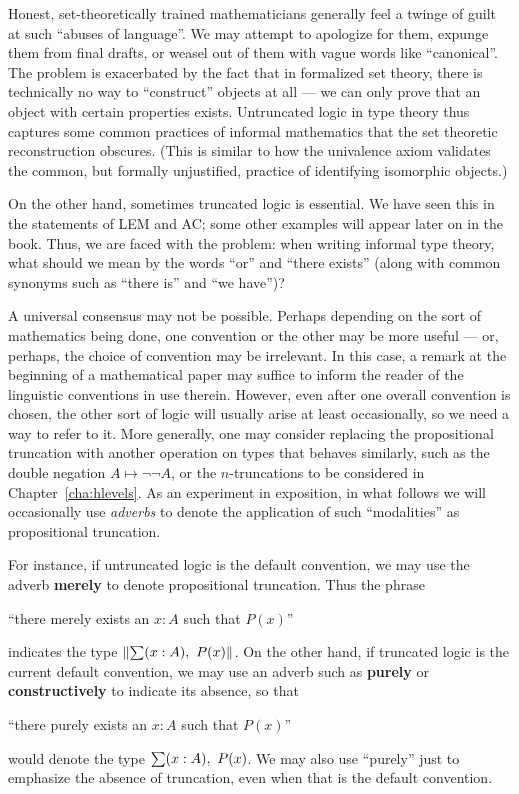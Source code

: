 Honest, set-theoretically trained mathematicians generally feel a twinge of guilt at such ``abuses of language''.
We may attempt to apologize for them, expunge them from final drafts, or weasel out of them with vague words like ``canonical''.
The problem is exacerbated by the fact that in formalized set theory, there is technically no way to ``construct'' objects at all --- we can only prove that an object with certain properties exists.
Untruncated logic in type theory thus captures some common practices of informal mathematics that the set theoretic reconstruction obscures.
(This is similar to how the univalence axiom validates the common, but formally unjustified, practice of identifying isomorphic objects.)

On the other hand, sometimes truncated logic is essential.
We have seen this in the statements of LEM and AC; some other examples will appear later on in the book.
Thus, we are faced with the problem: when writing informal type theory, what should we mean by the words ``or'' and ``there exists'' (along with common synonyms such as ``there is'' and ``we have'')?

A universal consensus may not be possible.
Perhaps depending on the sort of mathematics being done, one convention or the other may be more useful --- or, perhaps, the choice of convention may be irrelevant.
In this case, a remark at the beginning of a mathematical paper may suffice to inform the reader of the linguistic conventions in use therein.
However, even after one overall convention is chosen, the other sort of logic will usually arise at least occasionally, so we need a way to refer to it.
More generally, one may consider replacing the propositional truncation with another operation on types that behaves similarly, such as the double negation $A\mapsto \neg\neg A$, or the $n$-truncations to be considered in Chapter~\ref{cha:hlevels}.
As an experiment in exposition,  in what follows we will occasionally use \emph{adverbs} to denote the application of such ``modalities'' as propositional truncation.

For instance, if untruncated logic is the default convention, we may use the adverb \textbf{merely} to denote propositional truncation.
Thus the phrase
\begin{center}
  ``there merely exists an $x:A$ such that $P(x)$''
\end{center}
indicates the type $\brck{\sm{x:A} P(x)}$.
On the other hand, if truncated logic is the current default convention, we may use an adverb such as \textbf{purely} or \textbf{constructively} to indicate its absence, so that
\begin{center}
``there purely exists an $x:A$ such that $P(x)$''
\end{center}
would denote the type $\sm{x:A} P(x)$.
We may also use ``purely'' just to emphasize the absence of truncation, even when that is the default convention.


